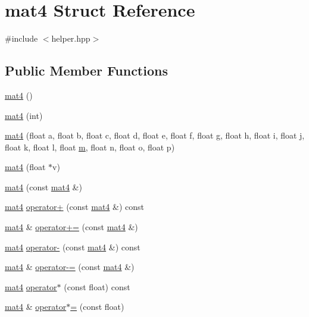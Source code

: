 \hypertarget{structmat4}{\section{mat4 Struct Reference}
\label{structmat4}
}


{\ttfamily \#include $<$helper.\+hpp$>$}

\subsection*{Public Member Functions}
\begin{DoxyCompactItemize}
\item 
\hyperlink{structmat4_acf3f0c37ff5c16e8fb1bfdde2bf87a0f}{mat4} ()
\item 
\hyperlink{structmat4_abbb345d8e90b7f5520a2854e4d171fad}{mat4} (int)
\item 
\hyperlink{structmat4_a9064945e550426ca0cbdc783abc159e3}{mat4} (float a, float b, float c, float d, float e, float f, float g, float h, float i, float j, float k, float l, float \hyperlink{structmat4_ab424bc8677a83f16bd30f4eaaecb6d3a}{m}, float n, float o, float p)
\item 
\hyperlink{structmat4_af9f2c48595cc3ef77b7264b6e1b80a9f}{mat4} (float $\ast$v)
\item 
\hyperlink{structmat4_a073e199b47525502781e3c36ef032dfb}{mat4} (const \hyperlink{structmat4}{mat4} \&)
\item 
\hyperlink{structmat4}{mat4} \hyperlink{structmat4_a1e09ab23f48d22eacf7480be5a6cea87}{operator+} (const \hyperlink{structmat4}{mat4} \&) const 
\item 
\hyperlink{structmat4}{mat4} \& \hyperlink{structmat4_a350e999ece6a2de198453342051887d5}{operator+=} (const \hyperlink{structmat4}{mat4} \&)
\item 
\hyperlink{structmat4}{mat4} \hyperlink{structmat4_a2ad7a60d812142642531b0ac06bf1c8e}{operator-\/} (const \hyperlink{structmat4}{mat4} \&) const 
\item 
\hyperlink{structmat4}{mat4} \& \hyperlink{structmat4_ac132dfe2e95f489dbd7164d91b535d7b}{operator-\/=} (const \hyperlink{structmat4}{mat4} \&)
\item 
\hyperlink{structmat4}{mat4} \hyperlink{structmat4_adfe86534dfda83be41334feaff6a9584}{operator$\ast$} (const float) const 
\item 
\hyperlink{structmat4}{mat4} \& \hyperlink{structmat4_ad0826521db3c90c1b3aba01c0e36d26e}{operator$\ast$=} (const float)
\item 

\end{DoxyCompactItemize}
